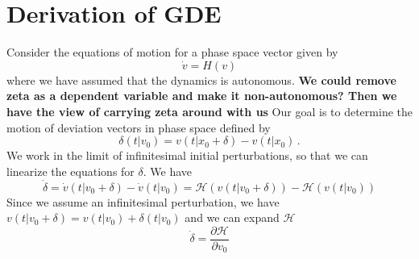 \documentclass[11pt,a4paper]{article}
\begin{document}
\section{Derivation of GDE}
Consider the equations of motion for a phase space vector given by
\begin{equation}
  \dot{v} = H(v)
\end{equation}
where we have assumed that the dynamics is autonomous. {\bf We could remove zeta as a dependent variable and make it non-autonomous?  Then we have the view of carrying zeta around with us}
Our goal is to determine the motion of deviation vectors in phase space defined by
\begin{equation}
  \delta(t|v_0) = v(t|x_0+\delta) - v(t|x_0) \, .
\end{equation}
We work in the limit of infinitesimal initial perturbations, so that we can linearize the equations for $\delta$.
We have
\begin{equation}
  \dot{\delta} = \dot{v}(t|v_0+\delta) - \dot{v}(t|v_0) = \mathcal{H}(v(t|v_0+\delta)) - \mathcal{H}(v(t|v_0))
\end{equation}
Since we assume an infinitesimal perturbation, we have $v(t|v_0+\delta) = v(t|v_0) + \delta(t|v_0)$ and we can expand $\mathcal{H}$
\begin{equation}
  \dot{\delta} = \frac{\partial\mathcal{H}}{\partial v_0}
\end{equation}
\end{document}
